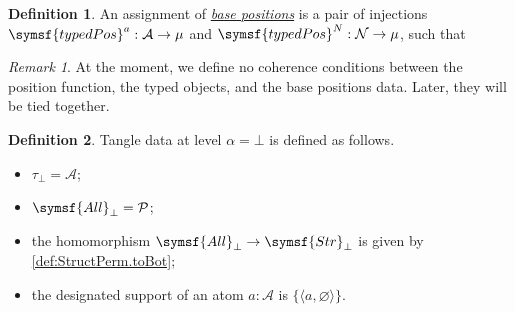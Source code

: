 \documentclass{article}
\newcommand{\cdef}[3]{\href{https://leanprover-community.github.io/con-nf/doc/ConNF/#1.html\#ConNF.#2}{\emph{#3}}}
\newcommand{\symmdiff}{\mathrel{\raisebox{1pt}{\( \mathsmaller\triangle \)}}}
\theoremstyle{definition}
\newtheorem{definition}{Definition}[section]
\theoremstyle{remark}
\newtheorem*{remark}{Remark}
\begin{document}
\begin{definition}
    An assignment of \cdef{Fuzz/Hypotheses}{BasePositions}{base positions} is a pair of injections \( \symsf{typedPos}^a : \mathcal A \to \mu \) and \( \symsf{typedPos}^N : \mathcal N \to \mu \), such that
\end{definition}
\begin{remark}
    At the moment, we define no coherence conditions between the position function, the typed objects, and the base positions data.
    Later, they will be tied together.
\end{remark}
\begin{definition}
    Tangle data at level \( \alpha = \bot \) is defined as follows.
    \begin{itemize}
        \item \( \tau_\bot = \mathcal A \);
        \item \( \symsf{All}_\bot = \mathcal P \);
        \item the homomorphism \( \symsf{All}_\bot \to \symsf{Str}_\bot \) is given by \cref{def:StructPerm.toBot};
        \item the designated support of an atom \( a : \mathcal A \) is \( \{\langle a, \varnothing \rangle\} \).
    \end{itemize}
\end{definition}
\end{document}
